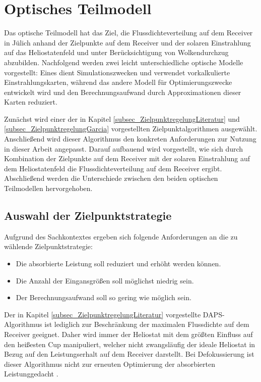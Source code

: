 \section{Optisches Teilmodell} \label{sec_optischesModell}
Das optische Teilmodell hat das Ziel, die Flussdichteverteilung auf dem Receiver in Jülich anhand der Zielpunkte auf dem Receiver und der solaren Einstrahlung auf das Heliostatenfeld und unter Berücksichtigung von Wolkendurchzug abzubilden.
Nachfolgend werden zwei leicht unterschiedliche optische Modelle vorgestellt:
Eines dient Simulationszwecken und verwendet vorkalkulierte Einstrahlungskarten, während das andere Modell für Optimierungszwecke entwickelt wird und den Berechnungsaufwand durch Approximationen dieser Karten reduziert.

Zunächst wird einer der in Kapitel \ref{subsec_ZielpunktregelungLiteratur} und \ref{subsec_ZielpunktregelungGarcia} vorgestellten Zielpunktalgorithmen ausgewählt.
Anschließend wird dieser Algorithmus den konkreten Anforderungen zur Nutzung in dieser Arbeit angepasst.
Darauf aufbauend wird vorgestellt, wie sich durch Kombination der Zielpunkte auf dem Receiver mit der solaren Einstrahlung auf dem Heliostatenfeld die Flussdichteverteilung auf dem Receiver ergibt.
Abschließend werden die Unterschiede zwischen den beiden optischen Teilmodellen hervorgehoben.


\subsection{Auswahl der Zielpunktstrategie} \label{subsec_AuswahlAlgorithmus}
Aufgrund des Sachkontextes ergeben sich folgende Anforderungen an die zu wählende Zielpunktstrategie:
\begin{itemize}
\item Die absorbierte Leistung soll reduziert und erhöht werden können.
\item Die Anzahl der Eingansgrößen soll möglichst niedrig sein.
\item Der Berechnungsaufwand soll so gering wie möglich sein.
\end{itemize}

Der in Kapitel \ref{subsec_ZielpunktregelungLiteratur} vorgestellte DAPS-Algorithmus \cite{VantHull2}\cite{VantHull3} ist lediglich zur Beschränkung der maximalen Flussdichte auf dem Receiver geeignet.
Daher wird immer der Heliostat mit dem größten Einfluss auf den heißesten Cup manipuliert, welcher nicht zwangsläufig der ideale Heliostat in Bezug auf den Leistungserhalt auf dem Receiver darstellt. \enlargethispage{\baselineskip}
Bei Defokussierung ist dieser Algorithmus nicht zur erneuten Optimierung der absorbierten Leistung\linebreak gedacht \cite[S.35]{DissOberkirsch}.

